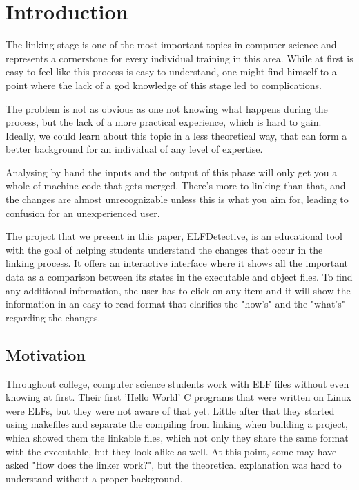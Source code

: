 \chapter{Introduction}
\label{chapter:intro}

The linking stage is one of the most important topics in computer science and represents a cornerstone for every individual training in this area. While at first is easy to feel like this process is easy to understand, one might find himself to a point where the lack of a god knowledge of this stage led to complications.

The problem is not as obvious as one not knowing what happens during the process, but the lack of a more practical experience, which is hard to gain. Ideally, we could learn about this topic in a less theoretical way, that can form a better background for an individual of any level of expertise. 

Analysing by hand the inputs and the output of this phase will only get you a whole of machine code that gets merged. There's more to linking than that, and the changes are almost unrecognizable unless this is what you aim for, leading to confusion for an unexperienced user.

The project that we present in this paper, ELFDetective, is an educational tool with the goal of helping students understand the changes that occur in the linking process. It offers an interactive interface where it shows all the important data as a comparison between its states in the executable and object files. To find any additional information, the user has to click on any item and it will show the information in an easy to read format that clarifies the "how's" and the "what's" regarding the changes.

\section{Motivation}
\label{sec:motivation}

Throughout college, computer science students work with ELF files without even knowing at first. Their first 'Hello World' C programs that were written on Linux were ELFs, but they were not aware of that yet. Little after that they started using makefiles and separate the compiling from linking when building a project, which showed them the linkable files, which not only they share the same format with the executable, but they look alike as well. At this point, some may have asked "How does the linker work?", but the theoretical explanation was hard to understand without a proper background. 

